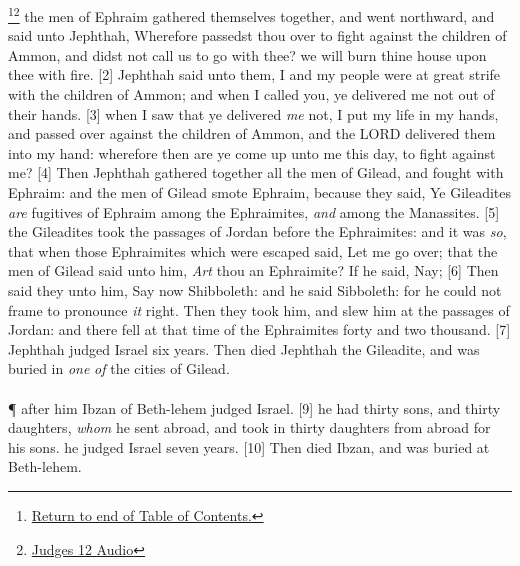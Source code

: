 \footnote{\textcolor[rgb]{0.00,0.25,0.00}{\hyperlink{JudgesTOC}{Return to end of Table of Contents.}}}\footnote{\href{https://audiobible.com/bible/judges_12.html}{\textcolor[cmyk]{0.99998,1,0,0}{Judges 12 Audio}}}\textcolor[cmyk]{0.99998,1,0,0}{ the men of Ephraim gathered themselves together, and went northward, and said unto Jephthah, Wherefore passedst thou over to fight against the children of Ammon, and didst not call us to go with thee? we will burn thine house upon thee with fire.}
[2] \textcolor[cmyk]{0.99998,1,0,0}{ Jephthah said unto them, I and my people were at great strife with the children of Ammon; and when I called you, ye delivered me not out of their hands.}
[3] \textcolor[cmyk]{0.99998,1,0,0}{ when I saw that ye delivered \emph{me} not, I put my life in my hands, and passed over against the children of Ammon, and the LORD delivered them into my hand: wherefore then are ye come up unto me this day, to fight against me?}
[4] \textcolor[cmyk]{0.99998,1,0,0}{Then Jephthah gathered together all the men of Gilead, and fought with Ephraim: and the men of Gilead smote Ephraim, because they said, Ye Gileadites \emph{are} fugitives of Ephraim among the Ephraimites, \emph{and} among the Manassites.}
[5] \textcolor[cmyk]{0.99998,1,0,0}{ the Gileadites took the passages of Jordan before the Ephraimites: and it was \emph{so}, that when those Ephraimites which were escaped said, Let me go over; that the men of Gilead said unto him, \emph{Art} thou an Ephraimite? If he said, Nay;}
[6] \textcolor[cmyk]{0.99998,1,0,0}{Then said they unto him, Say now Shibboleth: and he said Sibboleth: for he could not frame to pronounce \emph{it} right. Then they took him, and slew him at the passages of Jordan: and there fell at that time of the Ephraimites forty and two thousand.}
[7] \textcolor[cmyk]{0.99998,1,0,0}{ Jephthah judged Israel six years. Then died Jephthah the Gileadite, and was buried in \emph{one} \emph{of} the cities of Gilead.}\\
\\
\P \textcolor[cmyk]{0.99998,1,0,0}{ after him Ibzan of Beth-lehem judged Israel.}
[9] \textcolor[cmyk]{0.99998,1,0,0}{ he had thirty sons, and thirty daughters, \emph{whom} he sent abroad, and took in thirty daughters from abroad for his sons.  he judged Israel seven years.}
[10] \textcolor[cmyk]{0.99998,1,0,0}{Then died Ibzan, and was buried at Beth-lehem.}\\
